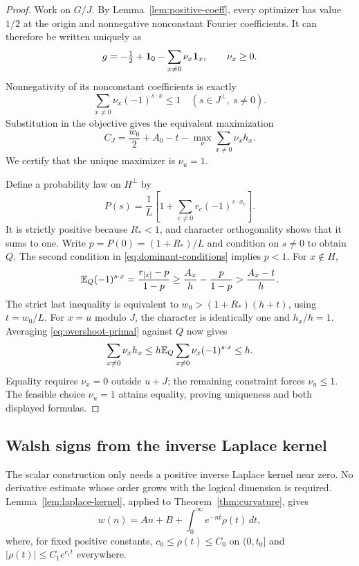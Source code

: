 \begin{proof}
Work on $G/J$. By Lemma~\ref{lem:positive-coeff}, every optimizer
has value $1/2$ at the origin and nonnegative nonconstant Fourier
coefficients. It can therefore be written uniquely as
\[
 g=-\tfrac12+\mathbf 1_0-\sum_{x\ne0}\nu_x\mathbf 1_x,\qquad \nu_x\ge0.
\]
Nonnegativity of its nonconstant coefficients is exactly
\begin{equation}\label{eq:overshoot-primal}
 \sum_{x\ne0}\nu_x(-1)^{s\cdot x}\le1
 \quad(s\in J^\perp,\ s\ne0).
\end{equation}
Substitution in the objective gives the equivalent maximization
\[
 C_J=\frac{w_0}{2}+A_0-t
       -\max_{\nu}\sum_{x\ne0}\nu_xh_x.
\]
We certify that the unique maximizer is $\nu_u=1$.

Define a probability law on $H^\perp$ by
\[
 P(s)=\frac1L\left[1+\sum_{c\ne0}r_c(-1)^{s\cdot x_c}\right].
\]
It is strictly positive because $R_*<1$, and character orthogonality
shows that it sums to one. Write $p=P(0)=(1+R_*)/L$ and condition on
$s\ne0$ to obtain $Q$. The second condition in
\eqref{eq:dominant-conditions} implies $p<1$. For $x\notin H$,
\[
 \mathbb E_Q(-1)^{s\cdot x}
 =\frac{r_{[x]}-p}{1-p}
 \ge\frac{A_x}{h}-\frac p{1-p}
 >\frac{A_x-t}{h}.
\]
The strict last inequality is equivalent to
$w_0>(1+R_*)(h+t)$, using $t=w_0/L$.
For $x=u$ modulo $J$, the character is identically one and $h_x/h=1$.
Averaging \eqref{eq:overshoot-primal} against $Q$ now gives
\[
 \sum_{x\ne0}\nu_xh_x
 \le h\mathbb E_Q\sum_{x\ne0}\nu_x(-1)^{s\cdot x}\le h.
\]
Equality requires $\nu_x=0$ outside $u+J$; the remaining constraint
forces $\nu_u\le1$. The feasible choice $\nu_u=1$ attains equality,
proving uniqueness and both displayed formulas.
\end{proof}

\subsection{Walsh signs from the inverse Laplace kernel}

The scalar construction only needs a positive inverse Laplace kernel
near zero. No derivative estimate whose order grows with the logical
dimension is required. Lemma~\ref{lem:laplace-kernel}, applied to
Theorem~\ref{thm:curvature}, gives
\[
 w(n)=An+B+\int_0^\infty e^{-nt}\rho(t)\,dt,
\]
where, for fixed positive constants, $c_0\le\rho(t)\le C_0$ on
$(0,t_0]$ and $|\rho(t)|\le C_1e^{c_1t}$ everywhere.

